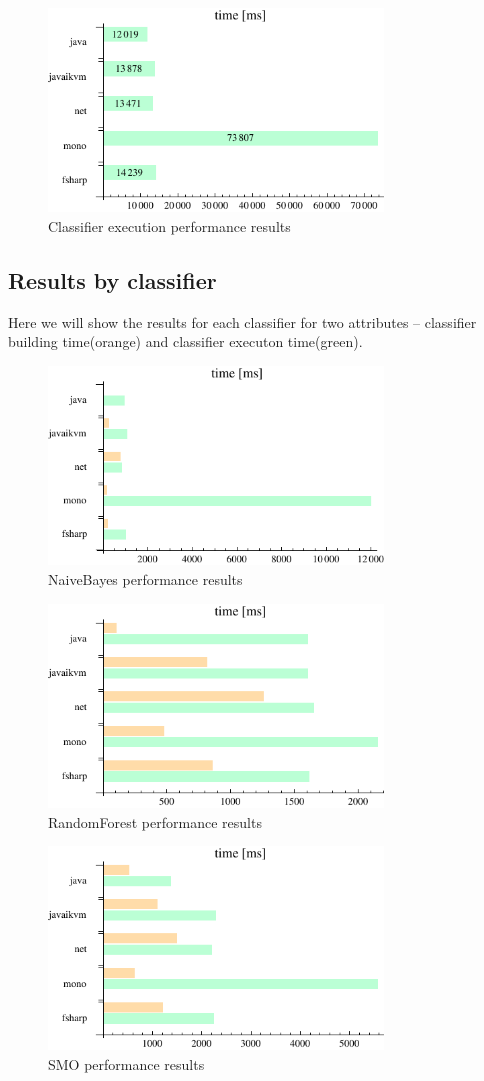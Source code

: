 \documentclass[journal]{IEEEtran/IEEEtran}
\newcommand\subsect[1]{\subsection{#1}\noindent}
\begin{document}
\begin{figure}[H]
\centering
\includegraphics[width=3.5in]{classify}
\caption{Classifier execution performance results}
\end{figure}
\subsect{Results by classifier}
Here we will show the results for each classifier for two attributes -- classifier building time(orange) and classifier executon time(green).
\begin{figure}[H]
\centering
\includegraphics[width=3.5in]{NaiveBayes}
\caption{NaiveBayes performance results}
\end{figure}
\begin{figure}[H]
\centering
\includegraphics[width=3.5in]{RandomForest}
\caption{RandomForest performance results}
\end{figure}
\begin{figure}[H]
\centering
\includegraphics[width=3.5in]{SMO}
\caption{SMO performance results}
\end{figure}
\end{document}
